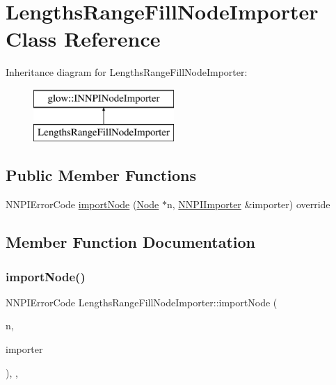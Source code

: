 \hypertarget{class_lengths_range_fill_node_importer}{}\section{Lengths\+Range\+Fill\+Node\+Importer Class Reference}
\label{class_lengths_range_fill_node_importer}
Inheritance diagram for Lengths\+Range\+Fill\+Node\+Importer\+:\begin{figure}[H]
\begin{center}
\leavevmode
\includegraphics[height=2.000000cm]{class_lengths_range_fill_node_importer}
\end{center}
\end{figure}
\subsection*{Public Member Functions}
\begin{DoxyCompactItemize}
\item 
N\+N\+P\+I\+Error\+Code \hyperlink{class_lengths_range_fill_node_importer_aac535fb9b056542b044073e8d7f13fe4}{import\+Node} (\hyperlink{classglow_1_1_node}{Node} $\ast$n, \hyperlink{classglow_1_1_n_n_p_i_importer}{N\+N\+P\+I\+Importer} \&importer) override
\end{DoxyCompactItemize}


\subsection{Member Function Documentation}
\mbox{\label{class_lengths_range_fill_node_importer_aac535fb9b056542b044073e8d7f13fe4}} 
\subsubsection{\texorpdfstring{import\+Node()}{importNode()}}
{\footnotesize\ttfamily N\+N\+P\+I\+Error\+Code Lengths\+Range\+Fill\+Node\+Importer\+::import\+Node (\begin{DoxyParamCaption}\item[{\hyperlink{classglow_1_1_node}{Node} $\ast$}]{n,  }\item[{\hyperlink{classglow_1_1_n_n_p_i_importer}{N\+N\+P\+I\+Importer} \&}]{importer }\end{DoxyParamCaption})\hspace{0.3cm}{\ttfamily [inline]}, {\ttfamily [override]}, {\ttfamily [virtual]}}

